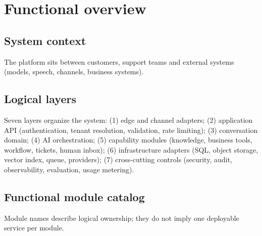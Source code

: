 \chapter{Functional overview}

\section{System context}
The platform sits between customers, support teams and external systems (models, speech, channels, business systems).


\section{Logical layers}

Seven layers organize the system: (1) edge and channel adapters; (2) application API (authentication, tenant resolution, validation, rate limiting); (3) conversation domain; (4) AI orchestration; (5) capability modules (knowledge, business tools, workflow, tickets, human inbox); (6) infrastructure adapters (SQL, object storage, vector index, queue, providers); (7) cross-cutting controls (security, audit, observability, evaluation, usage metering).

\section{Functional module catalog}
Module names describe logical ownership; they do not imply one deployable service per module.

